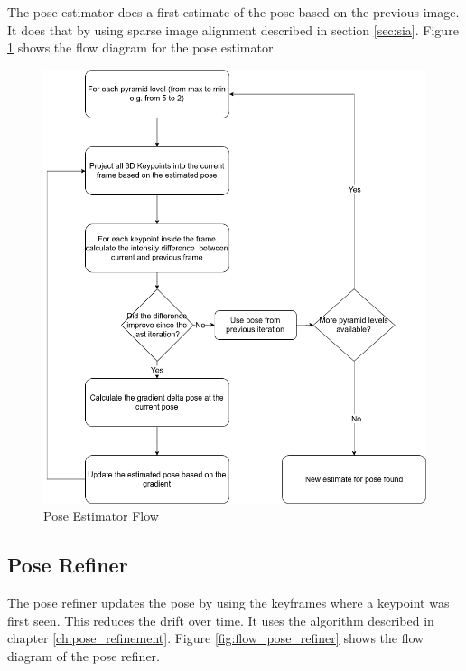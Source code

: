 \documentclass[11pt,a4paper,titlepage,oneside]{report}
\begin{document}
The pose estimator does a first estimate of the pose based on the previous image. It does that by using sparse image alignment described in section \ref{sec:sia}. Figure \ref{fig:flow_pose_estimator} shows the flow diagram for the pose estimator.

\begin{figure}[H]
  \centering
  \includegraphics[scale=0.3]{img/flow_pose_estimator.png}
  \caption{Pose Estimator Flow}\label{fig:flow_pose_estimator}
\end{figure}

\subsection{Pose Refiner}

The pose refiner updates the pose by using the keyframes where a keypoint was first seen. This reduces the drift over time. It uses the algorithm described in chapter \ref{ch:pose_refinement}. Figure \ref{fig:flow_pose_refiner} shows the flow diagram of the pose refiner.
\end{document}

